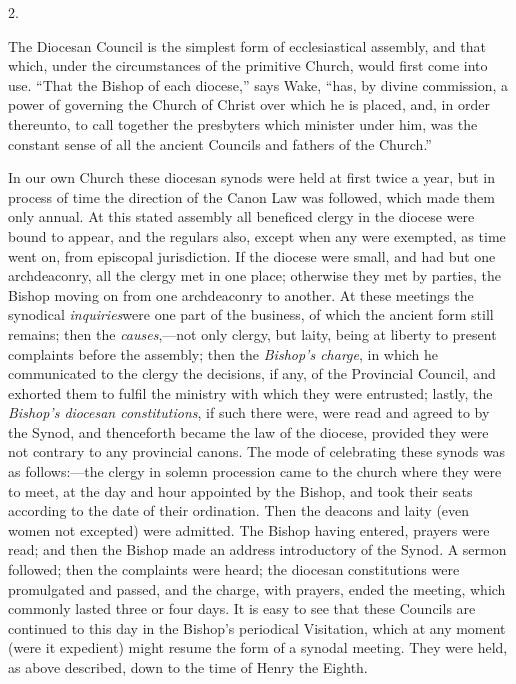 2.

The Diocesan Council is the
simplest form of ecclesiastical assembly, and that which, under the
circumstances of the primitive Church, would first come into use. ``That
the Bishop of each diocese,'' says Wake, ``has, by divine commission, a
power of governing the Church of Christ over which he is placed,
and, in order thereunto, to call together the presbyters which
minister under him, was the constant sense of all the ancient Councils
and fathers of the Church.''

In our own Church these
diocesan synods were held at first twice a year, but in process of
time the direction of the Canon Law was followed, which made them only
annual. At this stated assembly all beneficed clergy in the diocese
were bound to appear, and the regulars also, except when any were
exempted, as time went on, from episcopal jurisdiction. If the diocese
were small, and had but one archdeaconry, all the clergy met in one
place; otherwise they met by parties, the Bishop moving on from one
archdeaconry to another. At these meetings the synodical \emph{inquiries}were
one part of the business, of which the ancient form still remains;
then the \emph{causes},—not only clergy, but laity, being at liberty
to present complaints before the assembly; then the \emph{Bishop's charge},
in which he communicated to the clergy the decisions, if any, of the
Provincial Council, and exhorted them to fulfil the ministry with
which they were entrusted; lastly, the \emph{Bishop's diocesan
constitutions}, if such there were, were read and agreed to by the
Synod, and thenceforth became the law of the diocese, provided they
were not contrary to any provincial canons. The mode of celebrating
these synods was as follows:—the clergy in solemn procession came to
the church where they were to meet, at the day and hour appointed by
the Bishop, and took their seats according to the date of their
ordination. Then the deacons and laity (even women not excepted) were
admitted. The Bishop having entered, prayers were read; and then the
Bishop made an address introductory of the Synod. A sermon followed;
then the complaints were heard; the diocesan constitutions were
promulgated and passed, and the charge, with prayers, ended the
meeting, which commonly lasted three or four days. It is easy to see
that these Councils are continued to this day in the Bishop's
periodical Visitation, which at any moment (were it expedient) might
resume the form of a synodal meeting. They were held, as above
described, down to the time of Henry the Eighth.

